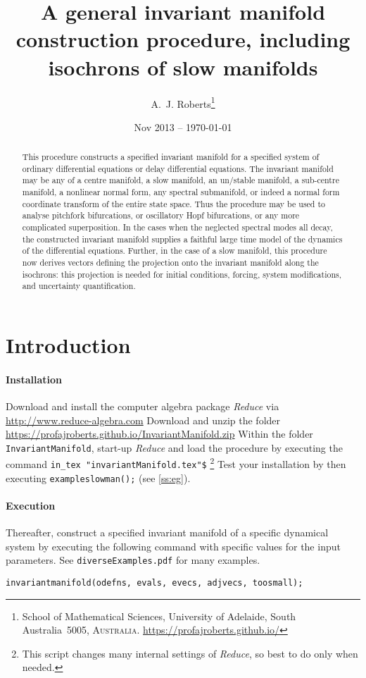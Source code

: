 \documentclass[11pt,a5paper]{article}
\title{A general invariant manifold construction procedure,
including isochrons of slow manifolds}
\author{A.~J. Roberts\thanks{School of Mathematical
Sciences, University of Adelaide, South Australia~5005,
\textsc{Australia}. \url{https://profajroberts.github.io/}}}
\date{Nov 2013 -- \today}
\begin{document}
\sloppy

\maketitle

\begin{abstract}
This procedure constructs a specified invariant manifold for
a specified system of ordinary differential equations or
delay differential equations. The invariant manifold may be
any of a centre manifold, a slow manifold, an un/stable
manifold, a sub-centre manifold, a nonlinear normal form,
any spectral submanifold, or indeed a normal form coordinate
transform of the entire state space. Thus the procedure may
be used to analyse pitchfork bifurcations, or oscillatory
Hopf bifurcations, or any more complicated superposition. In
the cases when the neglected spectral modes all decay, the
constructed invariant manifold supplies a faithful large
time model of the dynamics of the differential equations.
Further, in the case of a slow manifold, this procedure now
derives vectors defining the projection onto the invariant
manifold along the isochrons: this projection is needed for
initial conditions, forcing, system modifications, and
uncertainty quantification.
\end{abstract}

\tableofcontents



\section{Introduction}

\paragraph{Installation}
Download and install the computer algebra package
\emph{Reduce} via \url{http://www.reduce-algebra.com}\quad
Download and unzip the folder
\url{https://profajroberts.github.io/InvariantManifold.zip}
\quad Within the folder \verb|InvariantManifold|, start-up
\emph{Reduce} and load the procedure by executing the
command \verb|in_tex "invariantManifold.tex"$|
\footnote{This script changes many internal settings of
\emph{Reduce}, so best to do only when needed.} Test your
installation by then executing \verb|exampleslowman();|
\quad(see \cref{ss:eg}).

\paragraph{Execution}
Thereafter, construct a specified invariant manifold of a
specific dynamical system by executing the following command
with specific values for the input parameters.  See
\verb|diverseExamples.pdf| for many examples.
\begin{verbatim}
invariantmanifold(odefns, evals, evecs, adjvecs, toosmall);
\end{verbatim}
\end{document}
